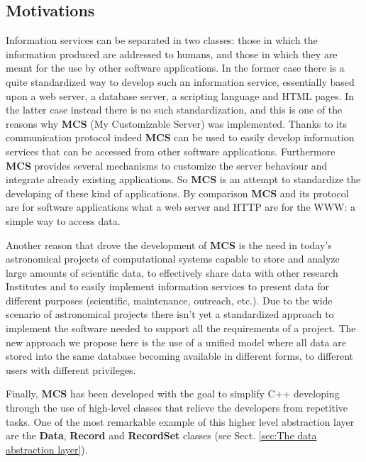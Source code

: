 \documentclass[12pt,titlepage]{article}
\newcommand{\mcs}{\textbf{MCS} }
\begin{document}
\subsection{Motivations}
Information services can be separated in two classes: those in which
the information produced are addressed to humans, and those in which
they are meant for the use by other software applications. In the
former case there is a quite standardized way to develop such an
information service, essentially based upon a web server, a database
server, a scripting language and HTML pages. In the latter case
instead there is no such standardization, and this is one of the
reasons why \mcs (My Customizable Server) was implemented. Thanks to
its communication protocol indeed \mcs can be used to easily develop
information services that can be accessed from other software
applications. Furthermore \mcs provides several mechanisms to customize
the server behaviour and integrate already existing applications. So
\mcs is an attempt to standardize the developing of these kind of
applications. By comparison \mcs and its protocol are for software
applications what a web server and HTTP are for the WWW: a simple way
to access data.

\bigskip
Another reason that drove the development of \mcs is the need in
today's astronomical projects of computational systems capable to
store and analyze large amounts of scientific data, to effectively
share data with other research Institutes and to easily implement
information services to present data for different purposes
(scientific, maintenance, outreach, etc.). Due to the wide scenario of
astronomical projects there isn't yet a standardized approach to
implement the software needed to support all the requirements of a
project. The new approach we propose here is the use of a unified
model where all data are stored into the same database becoming
available in different forms, to different users with different
privileges.

\bigskip
Finally, \mcs has been developed with the goal to simplify C++
developing through the use of high-level classes that relieve the
developers from repetitive tasks. One of the most remarkable example
of this higher level abstraction layer are the \textbf{Data},
\textbf{Record} and \textbf{RecordSet} classes (see Sect.
\ref{sec:The data abstraction layer}).
\end{document}
